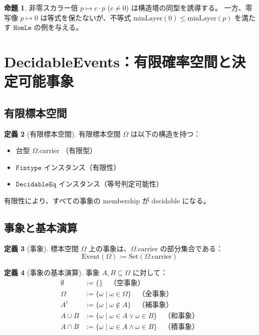 \documentclass[a4paper,12pt]{ltjsarticle}
\theoremstyle{definition}
\newtheorem{definition}{定義}[section]
\newtheorem{proposition}[definition]{命題}
\begin{document}
\begin{proposition}
非零スカラー倍 $p \mapsto c \cdot p$ ($c \neq 0$) は構造塔の同型を誘導する。
一方、零写像 $p \mapsto 0$ は等式を保たないが、不等式 $\text{minLayer}(0) \leq \text{minLayer}(p)$ を満たす
$\texttt{HomLe}$ の例を与える。
\end{proposition}

\section{DecidableEvents：有限確率空間と決定可能事象}

\subsection{有限標本空間}

\begin{definition}[有限標本空間]
有限標本空間 $\Omega$ は以下の構造を持つ：
\begin{itemize}
\item 台型 $\Omega.\text{carrier}$ （有限型）
\item $\texttt{Fintype}$ インスタンス（有限性）
\item $\texttt{DecidableEq}$ インスタンス（等号判定可能性）
\end{itemize}
\end{definition}

有限性により、すべての事象の membership が decidable になる。

\subsection{事象と基本演算}

\begin{definition}[事象]
標本空間 $\Omega$ 上の事象は、$\Omega.\text{carrier}$ の部分集合である：
\[
\text{Event}(\Omega) := \text{Set}(\Omega.\text{carrier})
\]
\end{definition}

\begin{definition}[事象の基本演算]
事象 $A, B \subseteq \Omega$ に対して：
\begin{align*}
\emptyset &:= \{\} \quad \text{（空事象）} \\
\Omega &:= \{\omega \mid \omega \in \Omega\} \quad \text{（全事象）} \\
A^c &:= \{\omega \mid \omega \notin A\} \quad \text{（補事象）} \\
A \cup B &:= \{\omega \mid \omega \in A \lor \omega \in B\} \quad \text{（和事象）} \\
A \cap B &:= \{\omega \mid \omega \in A \land \omega \in B\} \quad \text{（積事象）}
\end{align*}
\end{definition}
\end{document}
